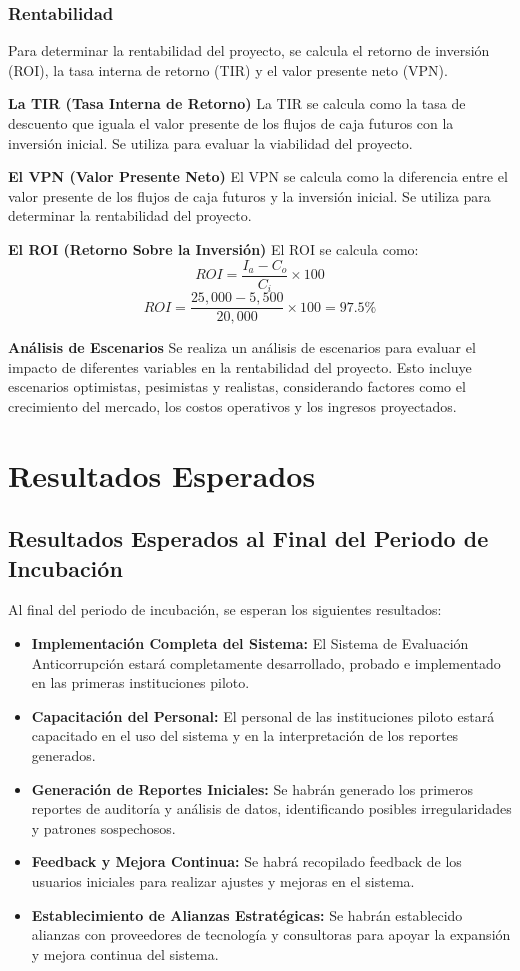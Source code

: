 \documentclass[a4paper,12pt]{article}
\begin{document}
\subsubsection{Rentabilidad}
Para determinar la rentabilidad del proyecto, se calcula el retorno de inversión (ROI), la tasa interna de retorno (TIR) y el valor presente neto (VPN).

\textbf{La TIR (Tasa Interna de Retorno)}
La TIR se calcula como la tasa de descuento que iguala el valor presente de los flujos de caja futuros con la inversión inicial. Se utiliza para evaluar la viabilidad del proyecto.

\textbf{El VPN (Valor Presente Neto)}
El VPN se calcula como la diferencia entre el valor presente de los flujos de caja futuros y la inversión inicial. Se utiliza para determinar la rentabilidad del proyecto.

\textbf{El ROI (Retorno Sobre la Inversión)}
El ROI se calcula como:
\[
ROI = \frac{I_a - C_o}{C_i} \times 100
\]
\[
ROI = \frac{25,000 - 5,500}{20,000} \times 100 = 97.5\%
\]

\textbf{Análisis de Escenarios}
Se realiza un análisis de escenarios para evaluar el impacto de diferentes variables en la rentabilidad del proyecto. Esto incluye escenarios optimistas, pesimistas y realistas, considerando factores como el crecimiento del mercado, los costos operativos y los ingresos proyectados.

\section{Resultados Esperados}
\subsection{Resultados Esperados al Final del Periodo de Incubación}
Al final del periodo de incubación, se esperan los siguientes resultados:

\begin{itemize}
    \item \textbf{Implementación Completa del Sistema:} El Sistema de Evaluación Anticorrupción estará completamente desarrollado, probado e implementado en las primeras instituciones piloto.
    \item \textbf{Capacitación del Personal:} El personal de las instituciones piloto estará capacitado en el uso del sistema y en la interpretación de los reportes generados.
    \item \textbf{Generación de Reportes Iniciales:} Se habrán generado los primeros reportes de auditoría y análisis de datos, identificando posibles irregularidades y patrones sospechosos.
    \item \textbf{Feedback y Mejora Continua:} Se habrá recopilado feedback de los usuarios iniciales para realizar ajustes y mejoras en el sistema.
    \item \textbf{Establecimiento de Alianzas Estratégicas:} Se habrán establecido alianzas con proveedores de tecnología y consultoras para apoyar la expansión y mejora continua del sistema.
\end{itemize}
\end{document}

